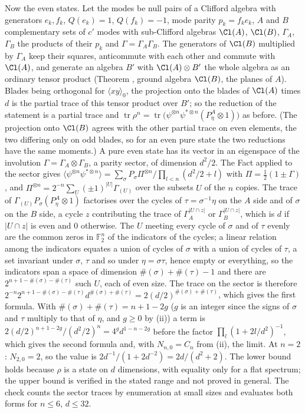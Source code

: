 Now the even states. Let the modes be null pairs of a Clifford algebra with generators $e_{k}, f_{k}$, $Q(e_{k}) = 1$, $Q(f_{k}) = -1$, mode parity $p_{k} = f_{k}e_{k}$, $A$ and $B$ complementary sets of $c'$ modes with sub-Clifford algebras $\Cl(A)$, $\Cl(B)$, $\Gamma_{A}$, $\Gamma_{B}$ the products of their $p_{k}$ and $\Gamma = \Gamma_{A}\Gamma_{B}$. The generators of $\Cl(B)$ multiplied by $\Gamma_{A}$ keep their squares, anticommute with each other and commute with $\Cl(A)$, and generate an algebra $B'$ with $\Cl(A) \otimes B'$ the whole algebra as an ordinary tensor product (Theorem , ground algebra $\Cl(B)$, the planes of $A$). Blades being orthogonal for $\langle xy\rangle_{0}$, the projection onto the blades of $\Cl(A)$ times $d$ is the partial trace of this tensor product over $B'$; so the reduction of the statement is a partial trace and $\operatorname{tr}\rho^{n} = \operatorname{tr}\bigl(\psi^{\otimes n}\psi^{*\otimes n}(P^{A}_{\eta} \otimes 1)\bigr)$ as before. (The projection onto $\Cl(B)$ agrees with the other partial trace on even elements, the two differing only on odd blades, so for an even pure state the two reductions have the same moments.) A pure even state has its vector in an eigenspace of the involution $\Gamma = \Gamma_{A} \otimes \Gamma_{B}$, a parity sector, of dimension $d^{2}/2$. The Fact applied to the sector gives $\langle \psi^{\otimes n}\psi^{*\otimes n}\rangle = \sum_{\sigma}P_{\sigma}\Pi^{\otimes n}/\prod_{l<n}(d^{2}/2 + l)$ with $\Pi = \tfrac12(1 \pm \Gamma)$, and $\Pi^{\otimes n} = 2^{-n}\sum_{U}(\pm 1)^{|U|}\Gamma_{(U)}$ over the subsets $U$ of the $n$ copies. The trace of $\Gamma_{(U)}P_{\sigma}(P^{A}_{\eta} \otimes 1)$ factorises over the cycles of $\tau = \sigma^{-1}\eta$ on the $A$ side and of $\sigma$ on the $B$ side, a cycle $z$ contributing the trace of $\Gamma_{A}^{|U \cap z|}$ or $\Gamma_{B}^{|U \cap z|}$, which is $d$ if $|U \cap z|$ is even and $0$ otherwise. The $U$ meeting every cycle of $\sigma$ and of $\tau$ evenly are the common zeros in $\mathbb{F}_{2}^{n}$ of the indicators of the cycles; a linear relation among the indicators equates a union of cycles of $\sigma$ with a union of cycles of $\tau$, a set invariant under $\sigma$, $\tau$ and so under $\eta = \sigma\tau$, hence empty or everything, so the indicators span a space of dimension $\#(\sigma) + \#(\tau) - 1$ and there are $2^{n+1-\#(\sigma)-\#(\tau)}$ such $U$, each of even size. The trace on the sector is therefore $2^{-n}2^{n+1-\#(\sigma)-\#(\tau)}d^{\#(\sigma)+\#(\tau)} = 2(d/2)^{\#(\sigma)+\#(\tau)}$, which gives the first formula. With $\#(\sigma) + \#(\tau) = n + 1 - 2g$ ($g$ is an integer since the signs of $\sigma$ and $\tau$ multiply to that of $\eta$, and $g \ge 0$ by (ii)) a term is $2(d/2)^{n+1-2g}/(d^{2}/2)^{n} = 4^{g}d^{1-n-2g}$ before the factor $\prod_{l}(1 + 2l/d^{2})^{-1}$, which gives the second formula and, with $N_{n,0} = C_{n}$ from (ii), the limit. At $n = 2$: $N_{2,0} = 2$, so the value is $2d^{-1}/(1 + 2d^{-2}) = 2d/(d^{2} + 2)$. The lower bound holds because $\rho$ is a state on $d$ dimensions, with equality only for a flat spectrum; the upper bound is verified in the stated range and not proved in general. The check counts the sector traces by enumeration at small sizes and evaluates both forms for $n \le 6$, $d \le 32$.

